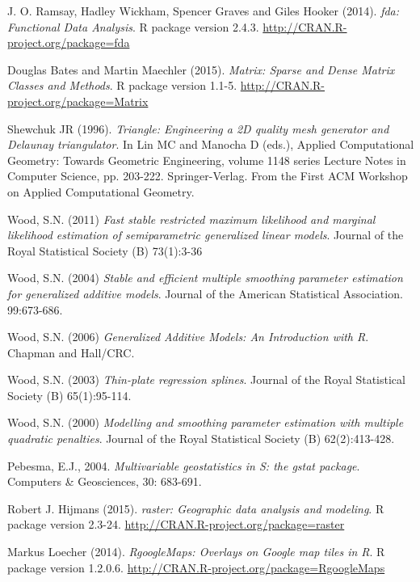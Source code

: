 \documentclass[a4paper,11pt,twoside,openright]{book}							%
\begin{document}
\begin{thebibliography}{99}
J. O. Ramsay, Hadley Wickham, Spencer Graves and Giles Hooker (2014). \emph{fda: Functional Data Analysis}. R package version 2.4.3. \href{http://CRAN.R-project.org/package=fda}{http://CRAN.R-project.org/package=fda}

Douglas Bates and Martin Maechler (2015). \emph{Matrix: Sparse and Dense Matrix Classes and Methods}. R package version 1.1-5. \href{http://CRAN.R-project.org/package=Matrix}{http://CRAN.R-project.org/package=Matrix}

Shewchuk JR (1996). \emph{Triangle: Engineering a 2D quality mesh generator and Delaunay triangulator}. In Lin MC and Manocha D (eds.), Applied Computational Geometry: Towards Geometric Engineering, volume 1148 series Lecture Notes in Computer Science, pp. 203-222. Springer-Verlag. From the First ACM Workshop on Applied Computational Geometry.

Wood, S.N. (2011) \emph{Fast stable restricted maximum likelihood and marginal likelihood estimation of semiparametric generalized linear models}. Journal of the Royal Statistical Society (B) 73(1):3-36

Wood, S.N. (2004) \emph{Stable and efficient multiple smoothing parameter estimation for generalized additive models}. Journal of the American Statistical Association. 99:673-686.

Wood, S.N. (2006) \emph{Generalized Additive Models: An Introduction with R}. Chapman and Hall/CRC.

Wood, S.N. (2003) \emph{Thin-plate regression splines}. Journal of the Royal Statistical Society (B) 65(1):95-114.
  
Wood, S.N. (2000) \emph{Modelling and smoothing parameter estimation with multiple quadratic penalties}. Journal of the Royal Statistical Society (B) 62(2):413-428.

Pebesma, E.J., 2004. \emph{Multivariable geostatistics in S: the gstat package}. Computers \& Geosciences, 30: 683-691.

Robert J. Hijmans (2015). \emph{raster: Geographic data analysis and modeling}. R package version 2.3-24. \href{http://CRAN.R-project.org/package=raster}{http://CRAN.R-project.org/package=raster}

Markus Loecher (2014). \emph{RgoogleMaps: Overlays on Google map tiles in R}. R package version 1.2.0.6. \href{http://CRAN.R-project.org/package=RgoogleMaps}{http://CRAN.R-project.org/package=RgoogleMaps}
  

\end{thebibliography}
\end{document}
